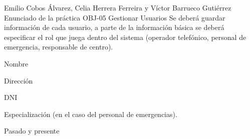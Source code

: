 {Emilio Cobos Álvarez, Celia Herrera Ferreira y Víctor Barrueco Gutiérrez}
{Enunciado de la práctica}
{OBJ-05 Gestionar Usuarios}
{}
{Se deberá guardar información de cada usuario, a parte de la información básica se deberá especificar el rol que juega dentro del sistema (operador telefónico, personal de emergencia, responsable de centro).}
{
\item{Nombre}
\item{Dirección}
\item{DNI}
\item{Especialización (en el caso del personal de emergencias).}
}
{Pasado y presente}

